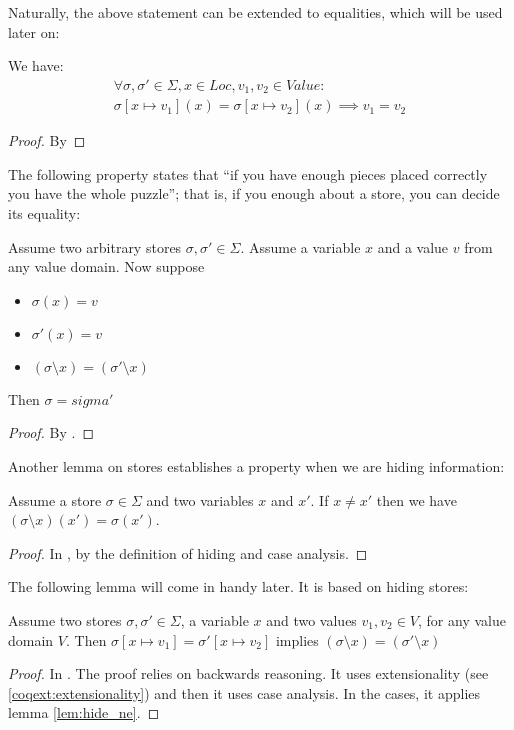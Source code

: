 Naturally, the above statement can be extended to equalities, which
will be used later on:
\begin{lem}
\label{lem:write-eq2}
  We have:
  \begin{multline*}
    \forall \sigma, \sigma' \in \Sigma, x \in Loc, v_1, v_2 \in Value
    \colon \\
    \sigma[x \mapsto v_1](x) = \sigma[x \mapsto v_2](x) \implies v_1 = v_2
  \end{multline*}
\end{lem}
\begin{proof}
  By \coq{}
\end{proof}

The following property states that ``if you have enough pieces placed
correctly you have the whole puzzle''; that is, if you enough about a
store, you can decide its equality:
\begin{lem}
\label{lem:hide-eq}
  Assume two arbitrary stores $\sigma, \sigma' \in \Sigma$. Assume a
  variable $x$ and a value $v$ from any value domain. Now suppose
  \begin{itemize}
  \item $\sigma(x) = v$
  \item $\sigma'(x) = v$
  \item $(\sigma \setminus x) = (\sigma' \setminus x)$
  \end{itemize}
  Then $\sigma = sigma'$
\end{lem}
\begin{proof}
  By \coq{}.
\end{proof}

Another lemma on stores establishes a property when we are hiding
information:
\begin{lem}
\label{lem:hide_ne}
  Assume a store $\sigma \in \Sigma$ and two variables $x$ and
  $x'$. If $x \neq x'$ then we have $(\sigma \setminus x)(x') = \sigma(x')$.
\end{lem}
\begin{proof}
  In \coq{}, by the definition of hiding and case analysis.
\end{proof}

The following lemma will come in handy later. It is based on hiding
stores:
\begin{lem}
\label{lem:write_hide}
  Assume two stores $\sigma, \sigma' \in \Sigma$, a variable $x$ and
  two values $v_1, v_2 \in V$, for any value domain $V$. Then
  $\sigma[x \mapsto v_1] = \sigma'[x \mapsto v_2]$ implies $(\sigma
  \setminus x) = (\sigma' \setminus x)$
\end{lem}
\begin{proof}
  In \coq{}. The proof relies on backwards reasoning. It uses
  extensionality (see \ref{coqext:extensionality}) and then it uses
  case analysis. In the cases, it applies lemma \eqref{lem:hide_ne}.
\end{proof}

